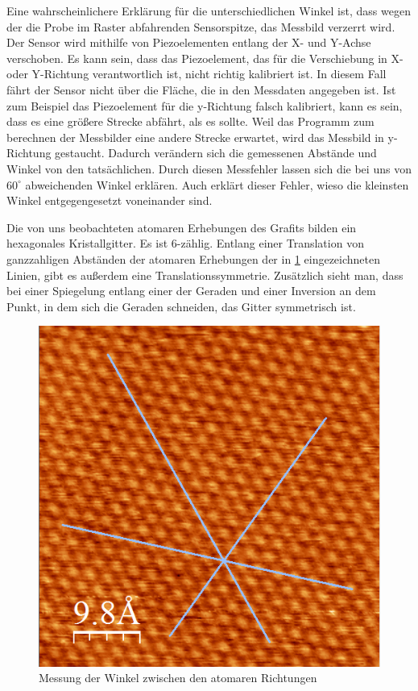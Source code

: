 \documentclass[10pt,a4paper]{article}
\begin{document}
 Eine wahrscheinlichere Erklärung für die unterschiedlichen Winkel ist, dass wegen der die Probe im Raster abfahrenden Sensorspitze, das Messbild verzerrt wird. Der Sensor wird mithilfe von Piezoelementen entlang der X- und Y-Achse verschoben. Es kann sein, dass das Piezoelement, das für die Verschiebung in X- oder Y-Richtung verantwortlich ist, nicht richtig kalibriert ist. In diesem Fall fährt der Sensor nicht über die Fläche, die in den Messdaten angegeben ist. Ist zum Beispiel das Piezoelement für die y-Richtung falsch kalibriert, kann es sein, dass es eine größere Strecke abfährt, als es sollte. Weil das Programm zum berechnen der Messbilder eine andere Strecke erwartet, wird das Messbild in y-Richtung gestaucht. Dadurch verändern sich die gemessenen Abstände und Winkel von den tatsächlichen. Durch diesen Messfehler lassen sich die bei uns von $60^\circ$ abweichenden Winkel erklären. Auch erklärt dieser Fehler, wieso die kleinsten Winkel entgegengesetzt voneinander sind.
 
Die von uns beobachteten atomaren Erhebungen des Grafits bilden ein hexagonales Kristallgitter. Es ist 6-zählig. Entlang einer Translation von ganzzahligen Abständen der atomaren Erhebungen der in \ref{Messungerh6} eingezeichneten Linien, gibt es außerdem eine Translationssymmetrie. Zusätzlich sieht man, dass bei einer Spiegelung entlang einer der Geraden und einer Inversion an dem Punkt, in dem sich die Geraden schneiden, das Gitter symmetrisch ist.

\begin{figure}[h]
	\centering
	
	\includegraphics[scale = 0.7]{Winkelmessung_kristall.png}
	
	\caption{Messung der Winkel zwischen den atomaren Richtungen}
	\label{Messungerh6}
\end{figure}
\end{document}
